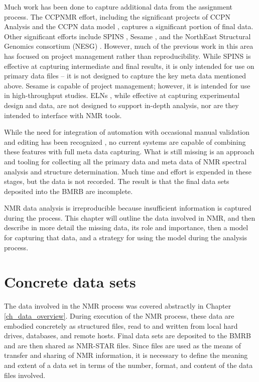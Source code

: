 Much work has been done to capture additional data from the assignment process.  
The CCPNMR effort, including the significant projects of CCPN Analysis and the 
CCPN data model \cite{ccpn}, captures a significant portion of final data.
Other significant efforts include SPINS \cite{baran2006spins}, 
Sesame \cite{sesame}, and the NorthEast Structural Genomics consortium (NESG)
 \cite{nesg2005nmr}.  However, much of the previous 
work in this area has focused on project management rather than reproducibility.
While SPINS is effective at capturing intermediate and final results, it is 
only intended for use on primary data files -- it is not designed to capture 
the key meta data mentioned above.  Sesame is capable of project management; 
however, it is intended for use in high-throughput studies.  ELNs 
\cite{rubacha2011eln}, while effective at capturing experimental design and
data, are not designed to support in-depth analysis, nor are they intended
to interface with NMR tools.

While the need for integration of automation with occasional manual 
validation and editing has been recognized \cite{baran2006spins}, no 
current systems are capable of combining these features with full 
meta data capturing.  
What is still missing is an approach and tooling for collecting all the primary 
data and meta data of NMR spectral analysis and structure determination.  Much 
time and effort is expended in these stages, but the data is not recorded.  The 
result is that the final data sets deposited into the BMRB are incomplete.



NMR data analysis is irreproducible because insufficient information is
captured during the process.  
This chapter will outline the data involved in NMR, and then 
describe in more detail the missing data, its role and importance, 
then a model for capturing that data, and a strategy for using
the model during the analysis process.



\section{Concrete data sets}
The data involved in the NMR process was covered abstractly in Chapter 
\ref{ch_data_overview}.  During execution of the NMR process, these data
are embodied concretely as structured files, read to and written from
local hard drives, databases, and remote hosts.  Final data sets are 
deposited to the BMRB and are then shared as NMR-STAR files.  Since files
are used as the means of transfer and sharing of NMR information, it is 
necessary to define the meaning and extent of a data set in terms of the
number, format, and content of the data files involved.

